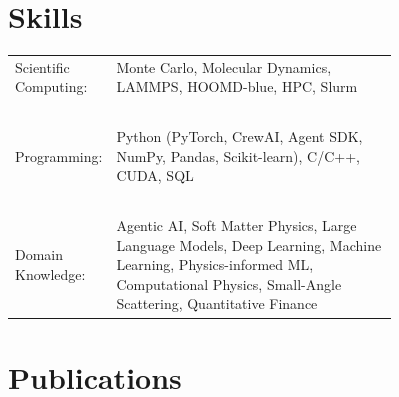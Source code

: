 \documentclass[11pt,letterpaper]{article}
\begin{document}
\section*{Skills}
\begin{longtable}{l p{0.76\linewidth}}
    Scientific Computing: & Monte Carlo, Molecular Dynamics, LAMMPS, HOOMD-blue, HPC, Slurm \\~\\
    Programming: & Python (PyTorch, CrewAI, Agent SDK, NumPy, Pandas, Scikit-learn), C/C++, CUDA, SQL \\~\\
    Domain Knowledge:& Agentic AI, Soft Matter Physics, Large Language Models, Deep Learning, Machine Learning, Physics-informed ML, Computational Physics, Small-Angle Scattering, Quantitative Finance
\end{longtable}


\section*{Publications}
%
%

\end{document}
